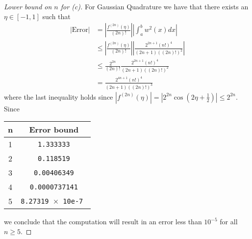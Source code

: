 \documentclass[8pt]{article}
\theoremstyle{definition}
\begin{document}
\begin{proof}[Lower bound on $n$ for (c)]
For Gaussian Quadrature we have that there exists an $\eta \in [-1, 1]$ such that
\begin{align*}
\left| \text{Error} \right| &= \left| \frac{f^{(2n)} (\eta)}{(2n)!} \right| \left| \int_{a}^{b} w^2 (x) dx \right| \\
&\leq \left| \frac{f^{(2n)} (\eta)}{(2n)!} \right| \left| \frac{2^{2n + 1} (n!)^4}{(2n + 1) ((2n)!)^2} \right| \\
&\leq \frac{2^{2n}}{(2n)!} \frac{2^{2n + 1} (n!)^4}{(2n + 1) ((2n)!)^2} \\
&= \frac{2^{4n + 1} (n!)^4}{(2n + 1) ((2n)!)^3}
\end{align*}
where the last inequality holds since $| f^{(2n)} (\eta) | = \left| 2^{2n} \cos \left( 2 \eta + \frac{1}{2} \right) \right| \leq 2^{2n}$. Since
\begin{center}
	\begin{tabular}{ | c | c |}
		\hline
		n & Error bound \\ \hline
		1 & \texttt{1.333333} \\ \hline
		2 & \texttt{0.118519} \\ \hline
		3 & \texttt{0.00406349} \\ \hline
		4 & \texttt{0.0000737141} \\ \hline
		5 & \texttt{8.27319 $\times$ 10e-7 } \\ \hline
	\end{tabular}
\end{center}
we conclude that the computation will result in an error less than $10^{-5}$ for all $n \geq 5$.
\end{proof}
\end{document}
